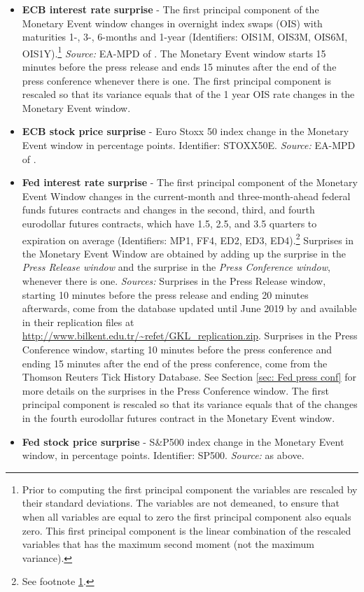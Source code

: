 \documentclass[a4paper,12pt]{article}
\begin{document}
\begin{itemize}
\item
\textbf{ECB interest rate surprise} - The first principal component of the Monetary Event window changes
in overnight index swaps (OIS) with maturities 1-, 3-, 6-months and 1-year (Identifiers: OIS1M, OIS3M, OIS6M, OIS1Y).\footnote{\label{footnote:pc}Prior to computing the first principal component the variables are rescaled by their standard deviations. The variables are not demeaned, to ensure
that when all variables are equal to zero the first principal component also equals zero. 
This first principal component is the linear combination of the rescaled variables that has
the maximum second moment (not the maximum variance).}
\emph{Source:} EA-MPD of \cite{Altavilla_etal_2019}. The Monetary Event window starts 15 minutes
before the press release and ends 15 minutes after the end of the press conference whenever there is one. 
The first principal component is rescaled so that its variance equals that of
the 1 year OIS rate changes in the Monetary Event window.
\item
\textbf{ECB stock price surprise} - 
Euro Stoxx 50 index change in the Monetary Event window in percentage points. Identifier: STOXX50E. \emph{Source:} EA-MPD of \cite{Altavilla_etal_2019}.
\item
\textbf{Fed interest rate surprise} - 
The first principal component of the Monetary Event Window changes in 
the current-month and three-month-ahead federal
funds futures contracts and changes in the second, third, and fourth eurodollar futures contracts,
which have 1.5, 2.5, and 3.5 quarters to expiration on average (Identifiers: MP1, FF4, ED2, ED3, ED4).\footnote{See footnote \ref{footnote:pc}.} Surprises in the Monetary Event Window are obtained by adding up the surprise in the \emph{Press Release window} and the surprise in the \emph{Press Conference window}, whenever there is one. \emph{Sources:} Surprises in the Press Release window, starting 10 minutes before the press release and ending 20 minutes afterwards, come from the \cite{Gurkaynak_Sack_Swanson_2005a} database updated until June 2019 by \cite{Gurkaynak_Karasoy_Lee_2021} and available in their replication files at \url{http://www.bilkent.edu.tr/~refet/GKL_replication.zip}. Surprises in the Press Conference window, starting 10 minutes before the press conference and ending 15 minutes after the end of the press conference, come from the Thomson Reuters Tick History Database. See Section \ref{sec: Fed press conf} for more details on the surprises in the Press Conference window.
The first principal component is rescaled so that its variance equals that of
the changes in the fourth eurodollar futures contract in the Monetary Event window.
\item
\textbf{Fed stock price surprise} - 
S\&P500 index change in the Monetary Event window, in percentage points. Identifier: SP500. \emph{Source:} as above.
\end{itemize}
\end{document}
